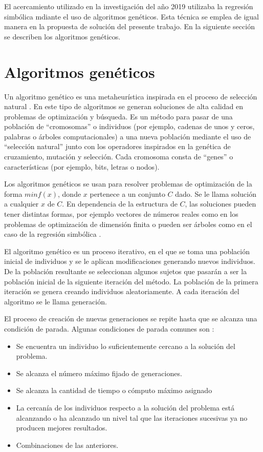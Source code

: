 El acercamiento utilizado en la investigación del año 2019 utilizaba la regresión simbólica mdiante el uso de algoritmos genéticos. Esta técnica se emplea de igual manera en la propuesta de solución del presente trabajo. En la siguiente sección se describen los algoritmos genéticos.

\section{Algoritmos genéticos}\label{section:genetic_algorithm}

Un algoritmo genético es una metaheurística inspirada en el proceso de selección natural \cite{mitchell1998introduction}. En este tipo de algoritmos se generan soluciones de alta calidad en problemas de optimización y búsqueda. Es un método para pasar de una población de ``cromosomas'' o individuos (por ejemplo, cadenas de unos y ceros, palabras o árboles computacionales) a una nueva población mediante el uso de ``selección natural'' junto con los operadores inspirados en la genética de cruzamiento, mutación y selección. Cada cromosoma consta de ``genes'' o características (por ejemplo, bits, letras o nodos).

Los algoritmos genéticos se usan para resolver problemas de optimización de la forma $min f(x)$, donde $x$ pertenece a un conjunto $C$ dado. Se le llama solución a cualquier $x$ de $C$. En dependencia de la estructura de $C$, las soluciones pueden tener distintas formas, por ejemplo vectores de números reales como en los problemas de optimización de dimensión finita \cite{mitchell1998introduction} o pueden ser árboles como en el caso de la regresión simbólica \cite{mitchell1998introduction}.

El algoritmo genético es un proceso iterativo, en el que se toma una población inicial de individuos y se le aplican modificaciones generando nuevos individuos. De la población resultante se seleccionan algunos sujetos que pasarán a ser la población inicial de la siguiente iteración del método. La población de la primera iteración se genera creando individuos aleatoriamente. A cada iteración del algoritmo se le llama generación.

El proceso de creación de nuevas generaciones se repite hasta que se alcanza una condición de parada. Algunas condiciones de parada comunes son \cite{mitchell1998introduction}:

\begin{itemize}
    \item Se encuentra un individuo lo suficientemente cercano a la solución del problema.
    \item Se alcanza el número máximo fijado de generaciones.
    \item Se alcanza la cantidad de tiempo o cómputo máximo asignado
    \item La cercanía de los individuos respecto a la solución del problema está alcanzando o ha alcanzado un nivel tal que las iteraciones sucesivas ya no producen mejores resultados.
    \item Combinaciones de las anteriores.
\end{itemize}

